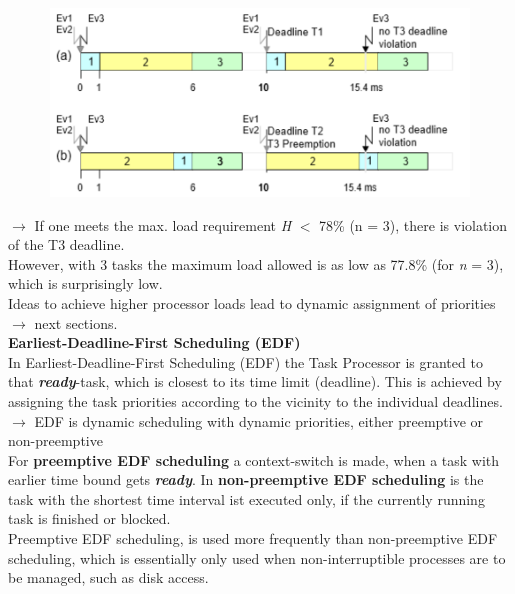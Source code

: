 	\begin{figure}[h]
    \centering
    \includegraphics[width=12cm, height=5cm]{Images/image187.png}
    \label{fig:Fig }
    \end{figure}
\newpage   
$\rightarrow$ If one meets the max. load requirement \textit{H} $\mathrm{<}$ 78\% (n = 3), there is violation of the T3 deadline.\\

However, with 3 tasks the maximum load allowed is as low as 77.8\% (for \textit{n} = 3), which is surprisingly low.\\

Ideas to achieve higher processor loads lead to dynamic assignment of priorities \\
$\rightarrow$ next sections.\\

{\rot\bf Earliest-Deadline-First Scheduling (EDF)}\\

In Earliest-Deadline-First Scheduling (EDF) the Task Processor is granted to that \textbf{\textit{ready}}-task, which is closest to its time limit (deadline). This is achieved by assigning the task priorities according to the vicinity to the individual deadlines.\\

$\rightarrow$ EDF is dynamic scheduling with dynamic priorities, either preemptive or non-preemptive\\

For \textbf{preemptive EDF scheduling} a context-switch is made, when a task with earlier time bound gets \textbf{\textit{ready}}. In \textbf{non-preemptive EDF scheduling} is the task with the shortest time interval ist executed only, if the currently running task is finished or blocked.\\

Preemptive EDF scheduling, is used more frequently than non-preemptive EDF scheduling, which is essentially only used when non-interruptible processes are to be managed, such as disk access.\\

